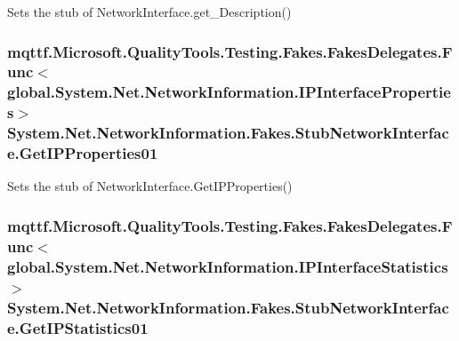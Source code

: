 Sets the stub of Network\-Interface.\-get\-\_\-\-Description()

\hypertarget{class_system_1_1_net_1_1_network_information_1_1_fakes_1_1_stub_network_interface_a3d5ddeb5695be5b61e4518ef6e401d0d}{
\subsubsection[{Get\-I\-P\-Properties01}]{\setlength{\rightskip}{0pt plus 5cm}mqttf.\-Microsoft.\-Quality\-Tools.\-Testing.\-Fakes.\-Fakes\-Delegates.\-Func$<$global.\-System.\-Net.\-Network\-Information.\-I\-P\-Interface\-Properties$>$ System.\-Net.\-Network\-Information.\-Fakes.\-Stub\-Network\-Interface.\-Get\-I\-P\-Properties01}}\label{class_system_1_1_net_1_1_network_information_1_1_fakes_1_1_stub_network_interface_a3d5ddeb5695be5b61e4518ef6e401d0d}


Sets the stub of Network\-Interface.\-Get\-I\-P\-Properties()

\hypertarget{class_system_1_1_net_1_1_network_information_1_1_fakes_1_1_stub_network_interface_a5f9af28356d254f4d11215dcb71d48b5}{
\subsubsection[{Get\-I\-P\-Statistics01}]{\setlength{\rightskip}{0pt plus 5cm}mqttf.\-Microsoft.\-Quality\-Tools.\-Testing.\-Fakes.\-Fakes\-Delegates.\-Func$<$global.\-System.\-Net.\-Network\-Information.\-I\-P\-Interface\-Statistics$>$ System.\-Net.\-Network\-Information.\-Fakes.\-Stub\-Network\-Interface.\-Get\-I\-P\-Statistics01}}\label{class_system_1_1_net_1_1_network_information_1_1_fakes_1_1_stub_network_interface_a5f9af28356d254f4d11215dcb71d48b5}


